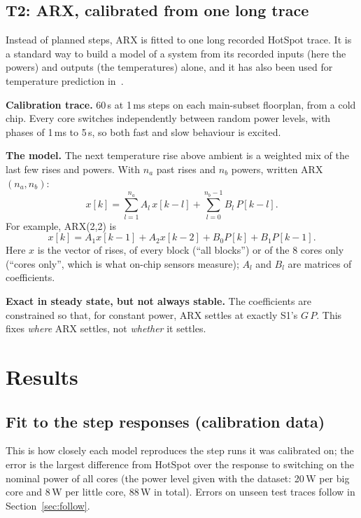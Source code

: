 \documentclass[11pt,a4paper]{article}
\begin{document}
\subsection{T2: ARX, calibrated from one long trace}\label{sec:arx}
Instead of planned steps, ARX is fitted to one long
recorded HotSpot trace. It is a standard way to build a model of a system from its recorded inputs
(here the powers) and outputs (the temperatures) alone, and it has also been used for temperature
prediction in~\cite{coskun09,singla15}.

\textbf{Calibration trace.} 60\,s at 1\,ms steps on each main-subset floorplan, from a cold chip.
Every core switches independently between random power levels, with phases of 1\,ms to 5\,s, so
both fast and slow behaviour is excited.

\textbf{The model.} The next temperature rise above ambient is a weighted mix of the last few rises
and powers. With $n_a$ past rises and $n_b$ powers, written ARX$(n_a, n_b)$:
\begin{equation}
  x[k] = \sum_{l=1}^{n_a} A_l\, x[k-l] + \sum_{l=0}^{n_b-1} B_l\, P[k-l].
  \label{eq:arx}
\end{equation}
For example, ARX(2,2) is
\[
  x[k] = A_1 x[k-1] + A_2 x[k-2] + B_0 P[k] + B_1 P[k-1].
\]
Here $x$ is the vector of rises, of every block (``all blocks'') or of the 8 cores only (``cores
only'', which is what on-chip sensors measure); $A_l$ and $B_l$ are matrices of coefficients.

\textbf{Exact in steady state, but not always stable.} The coefficients are constrained so that,
for constant power, ARX settles at exactly S1's $G\,P$. This fixes \emph{where} ARX settles, not
\emph{whether} it settles.

\section{Results}\label{sec:results}

\subsection{Fit to the step responses (calibration data)}
This is how closely each model reproduces the step runs it was calibrated on; the error is the
largest difference from HotSpot over the response to switching on the nominal power of all cores
(the power level given with the dataset: 20\,W per big core and 8\,W per little core, 88\,W in
total). Errors on unseen test traces follow in Section~\ref{sec:follow}.
\end{document}
